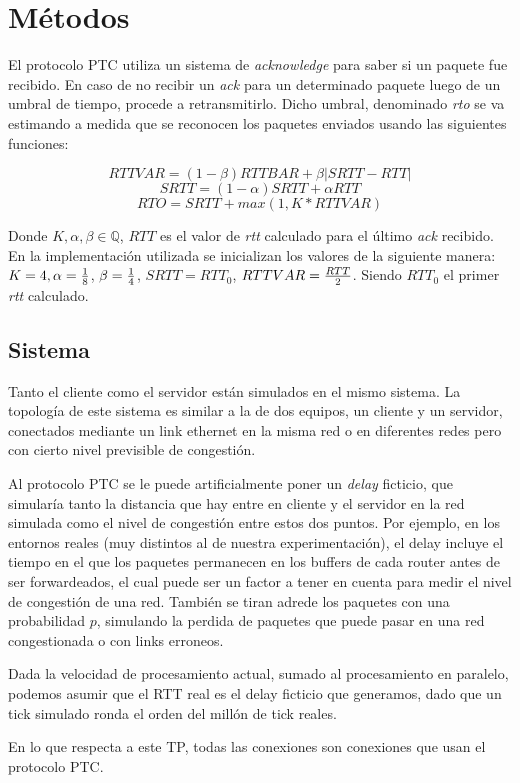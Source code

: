 \section{M\'etodos}

    El protocolo PTC utiliza un sistema de \textit{acknowledge} para
    saber si un paquete fue recibido. En caso de no recibir un \textit{ack}
    para un  determinado paquete luego de un umbral de tiempo, procede a
    retransmitirlo. Dicho umbral, denominado \textit{rto} se va estimando
    a medida que se reconocen los paquetes enviados usando las
    siguientes funciones:

        $$RTTVAR = (1-\beta)RTTBAR + \beta |SRTT-RTT|$$
        $$SRTT = (1-\alpha)SRTT + \alpha RTT$$
        $$RTO = SRTT + max( 1, K * RTTVAR) $$

    Donde $K, \alpha, \beta \in \mathbb{Q}$, $RTT$ es el valor de
    \textit{rtt} calculado para el \'ultimo \textit{ack} recibido.
    En la implementaci\'on utilizada se inicializan los valores de la
    siguiente manera: $K = 4, \alpha={{1}\over{8}}$,
    $\beta={{1}\over{4}}$, $SRTT={RTT_0}$, $RTTVAR={{RTT}\over{2}}$.
    Siendo $RTT_0$ el primer \textit{rtt} calculado.

\subsection{Sistema}

	Tanto el cliente como el servidor est\'an simulados en el mismo sistema. La
	topolog\'ia de este sistema es similar a la de dos equipos, un cliente y un
	servidor, conectados mediante un link ethernet en la misma red o en
	diferentes redes pero con cierto nivel previsible de congesti\'on.

	Al protocolo PTC se le puede artificialmente poner un \emph{delay} ficticio,
	que simular\'ia tanto la distancia que hay entre en cliente y el servidor en
	la red simulada como el nivel de congesti\'on entre estos dos puntos.
  Por ejemplo, en los entornos reales (muy distintos al de nuestra experimentaci\'on),
  el delay incluye el tiempo en el que
  los paquetes permanecen en los buffers de cada router antes de ser forwardeados,
  el cual puede ser un factor a tener en cuenta para medir el nivel de congesti\'on
  de una red.
	Tambi\'en se tiran adrede los paquetes con una probabilidad $p$, simulando
	la perdida de paquetes que puede pasar en una red congestionada o con links
	erroneos.

	Dada la velocidad de procesamiento actual, sumado al procesamiento en
	paralelo, podemos asumir que el RTT real es el delay ficticio que generamos,
	dado que un tick simulado ronda el orden del mill\'on de tick reales.

	En lo que respecta a este TP, todas las conexiones son conexiones que usan
	el protocolo PTC.
